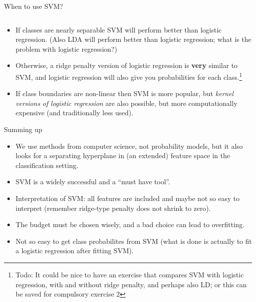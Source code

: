 \documentclass[10pt,ignorenonframetext,]{beamer}
\begin{document}
\begin{frame}

\begin{block}{When to use SVM?}

\(~\)

\begin{itemize}
\item
  If classes are nearly separable SVM will perform better than logistic
  regression. (Also LDA will perform better than logistic regression;
  what is the problem with logistic regression?)
\item
  Otherwise, a ridge penalty version of logistic regression is
  \textbf{very} similar to SVM, and logistic regression will also give
  you probabilities for each
  class.\footnote{Todo: It could be nice to have an exercise that compares SVM with logistic regression, with and without ridge penalty, and perhaps also LD; or this can be saved for compulsory exercise 2}
\item
  If class boundaries are non-linear then SVM is more popular, but
  \emph{kernel versions of logistic regression} are also possible, but
  more computationally expensive (and traditionally less used).
\end{itemize}

\end{block}

\end{frame}

\begin{frame}{Summing up}
\protect\hypertarget{summing-up}{}

\begin{itemize}
\item
  We use methods from computer science, not probability models, but it
  also looks for a separating hyperplane in (an extended) feature space
  in the classification setting.
\item
  SVM is a widely successful and a ``must have tool''.
\item
  Interpretation of SVM: all features are included and maybe not so easy
  to interpret (remember ridge-type penalty does not shrink to zero).
\item
  The budget must be chosen wisely, and a bad choice can lead to
  overfitting.
\item
  Not so easy to get class probabilites from SVM (what is done is
  actually to fit a logistic regression after fitting SVM).
\end{itemize}

\end{frame}
\end{document}

